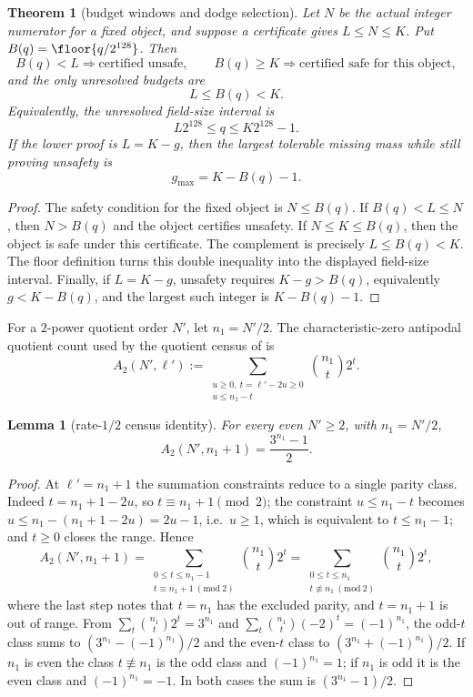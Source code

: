 \documentclass[11pt]{article}
\newtheorem{theorem}{Theorem}[section]
\newtheorem{lemma}[lemma]{Lemma}
\theoremstyle{definition}
\theoremstyle{remark}
\begin{document}
\begin{theorem}[budget windows and dodge selection]\label{thm:capf-windows}
Let $N$ be the actual integer numerator for a fixed object, and suppose a certificate gives $L\le N\le K$.  Put $B(q)=\floor{q/2^{128}}$.  Then
\[
        B(q)<L \Rightarrow \text{certified unsafe},
        \qquad
        B(q)\ge K \Rightarrow \text{certified safe for this object},
\]
and the only unresolved budgets are
\[
        L\le B(q)<K.
\]
Equivalently, the unresolved field-size interval is
\[
        L2^{128}\le q\le K2^{128}-1.
\]
If the lower proof is $L=K-g$, then the largest tolerable missing mass while still proving unsafety is
\[
        g_{\max}=K-B(q)-1.
\]
\end{theorem}

\begin{proof}
The safety condition for the fixed object is $N\le B(q)$.  If $B(q)<L\le N$, then $N>B(q)$ and the object certifies unsafety.  If $N\le K\le B(q)$, then the object is safe under this certificate.  The complement is precisely $L\le B(q)<K$.  The floor definition turns this double inequality into the displayed field-size interval.  Finally, if $L=K-g$, unsafety requires $K-g>B(q)$, equivalently $g<K-B(q)$, and the largest such integer is $K-B(q)-1$.
\end{proof}

For a $2$-power quotient order $N'$, let $n_1=N'/2$.  The characteristic-zero antipodal quotient count used by the quotient census of \cite{Cho26b} is
\[
        A_2(N',\ell')
        :=
        \sum_{\substack{u\ge0,\ t=\ell'-2u\ge0\\ u\le n_1-t}}
        \binom{n_1}{t}2^t .
\]

\begin{lemma}[rate-$1/2$ census identity]\label{lem:capf-census-identity}
For every even $N'\ge2$, with $n_1=N'/2$,
\[
        A_2(N',n_1+1)=\frac{3^{n_1}-1}{2}.
\]
\end{lemma}

\begin{proof}
At $\ell'=n_1+1$ the summation constraints reduce to a single parity class.  Indeed $t=n_1+1-2u$, so $t\equiv n_1+1\pmod2$; the constraint $u\le n_1-t$ becomes $u\le n_1-(n_1+1-2u)=2u-1$, i.e.\ $u\ge1$, which is equivalent to $t\le n_1-1$; and $t\ge0$ closes the range.  Hence
\[
        A_2(N',n_1+1)
        =\sum_{\substack{0\le t\le n_1-1\\ t\equiv n_1+1\ (\mathrm{mod}\ 2)}}\binom{n_1}t2^t
        =\sum_{\substack{0\le t\le n_1\\ t\not\equiv n_1\ (\mathrm{mod}\ 2)}}\binom{n_1}t2^t,
\]
where the last step notes that $t=n_1$ has the excluded parity, and $t=n_1+1$ is out of range.  From $\sum_t\binom{n_1}t2^t=3^{n_1}$ and $\sum_t\binom{n_1}t(-2)^t=(-1)^{n_1}$, the odd-$t$ class sums to $(3^{n_1}-(-1)^{n_1})/2$ and the even-$t$ class to $(3^{n_1}+(-1)^{n_1})/2$.  If $n_1$ is even the class $t\not\equiv n_1$ is the odd class and $(-1)^{n_1}=1$; if $n_1$ is odd it is the even class and $(-1)^{n_1}=-1$.  In both cases the sum is $(3^{n_1}-1)/2$.
\end{proof}
\end{document}
